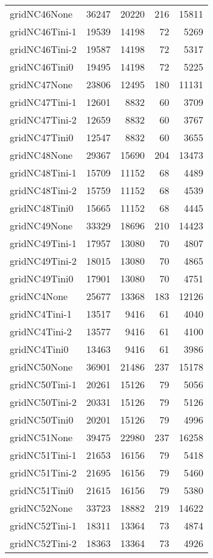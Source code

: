\begin{longtable}{lrrrr}
gridNC46None & 36247 & 20220 & 216 & 15811 \\
gridNC46Tini-1 & 19539 & 14198 & 72 & 5269 \\
gridNC46Tini-2 & 19587 & 14198 & 72 & 5317 \\
gridNC46Tini0 & 19495 & 14198 & 72 & 5225 \\
gridNC47None & 23806 & 12495 & 180 & 11131 \\
gridNC47Tini-1 & 12601 & 8832 & 60 & 3709 \\
gridNC47Tini-2 & 12659 & 8832 & 60 & 3767 \\
gridNC47Tini0 & 12547 & 8832 & 60 & 3655 \\
gridNC48None & 29367 & 15690 & 204 & 13473 \\
gridNC48Tini-1 & 15709 & 11152 & 68 & 4489 \\
gridNC48Tini-2 & 15759 & 11152 & 68 & 4539 \\
gridNC48Tini0 & 15665 & 11152 & 68 & 4445 \\
gridNC49None & 33329 & 18696 & 210 & 14423 \\
gridNC49Tini-1 & 17957 & 13080 & 70 & 4807 \\
gridNC49Tini-2 & 18015 & 13080 & 70 & 4865 \\
gridNC49Tini0 & 17901 & 13080 & 70 & 4751 \\
gridNC4None & 25677 & 13368 & 183 & 12126 \\
gridNC4Tini-1 & 13517 & 9416 & 61 & 4040 \\
gridNC4Tini-2 & 13577 & 9416 & 61 & 4100 \\
gridNC4Tini0 & 13463 & 9416 & 61 & 3986 \\
gridNC50None & 36901 & 21486 & 237 & 15178 \\
gridNC50Tini-1 & 20261 & 15126 & 79 & 5056 \\
gridNC50Tini-2 & 20331 & 15126 & 79 & 5126 \\
gridNC50Tini0 & 20201 & 15126 & 79 & 4996 \\
gridNC51None & 39475 & 22980 & 237 & 16258 \\
gridNC51Tini-1 & 21653 & 16156 & 79 & 5418 \\
gridNC51Tini-2 & 21695 & 16156 & 79 & 5460 \\
gridNC51Tini0 & 21615 & 16156 & 79 & 5380 \\
gridNC52None & 33723 & 18882 & 219 & 14622 \\
gridNC52Tini-1 & 18311 & 13364 & 73 & 4874 \\
gridNC52Tini-2 & 18363 & 13364 & 73 & 4926 \\

\end{longtable}
